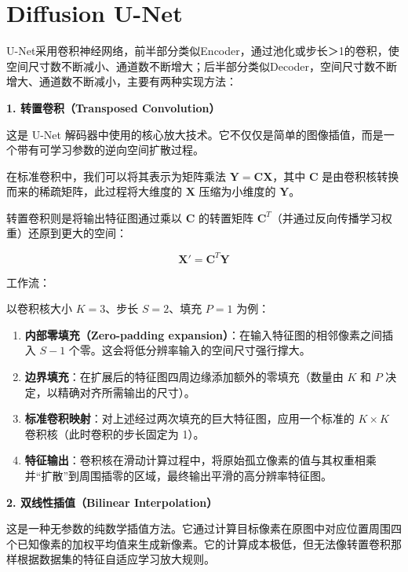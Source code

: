 \clearpage

\hypertarget{diffusion-u-net}{%
\section{Diffusion U-Net}\label{diffusion-u-net}}

U-Net采用卷积神经网络，前半部分类似Encoder，通过池化或步长＞1的卷积，使空间尺寸数不断减小、通道数不断增大；后半部分类似Decoder，空间尺寸数不断增大、通道数不断减小，主要有两种实现方法：

\textbf{1. 转置卷积（Transposed Convolution）}

这是 U-Net 解码器中使用的核心放大技术。它不仅仅是简单的图像插值，而是一个带有可学习参数的逆向空间扩散过程。

在标准卷积中，我们可以将其表示为矩阵乘法 \(\mathbf{Y}=\mathbf{C}\mathbf{X}\)，其中 \(\mathbf{C}\) 是由卷积核转换而来的稀疏矩阵，此过程将大维度的 \(\mathbf{X}\) 压缩为小维度的 \(\mathbf{Y}\)。

转置卷积则是将输出特征图通过乘以 \(\mathbf{C}\) 的转置矩阵 \(\mathbf{C}^T\)（并通过反向传播学习权重）还原到更大的空间：

\[
\mathbf{X}'=\mathbf{C}^T\mathbf{Y}
\]

工作流：

以卷积核大小 \(K=3\)、步长 \(S=2\)、填充 \(P=1\) 为例：

\begin{enumerate}
\def\labelenumi{\arabic{enumi}.}
\tightlist
\item
  \textbf{内部零填充（Zero-padding expansion）}：在输入特征图的相邻像素之间插入 \(S-1\) 个零。这会将低分辨率输入的空间尺寸强行撑大。
\item
  \textbf{边界填充}：在扩展后的特征图四周边缘添加额外的零填充（数量由 \(K\) 和 \(P\) 决定，以精确对齐所需输出的尺寸）。
\item
  \textbf{标准卷积映射}：对上述经过两次填充的巨大特征图，应用一个标准的 \(K\times K\) 卷积核（此时卷积的步长固定为 1）。
\item
  \textbf{特征输出}：卷积核在滑动计算过程中，将原始孤立像素的值与其权重相乘并``扩散''到周围插零的区域，最终输出平滑的高分辨率特征图。
\end{enumerate}

\textbf{2. 双线性插值（Bilinear Interpolation）}

这是一种无参数的纯数学插值方法。它通过计算目标像素在原图中对应位置周围四个已知像素的加权平均值来生成新像素。它的计算成本极低，但无法像转置卷积那样根据数据集的特征自适应学习放大规则。

